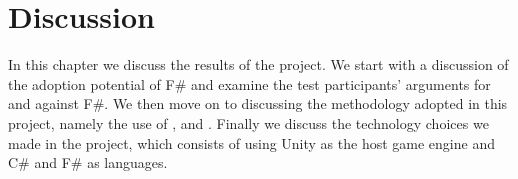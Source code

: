 \chapter{Discussion}
In this chapter we discuss the results of the project. We start with a discussion of the adoption potential of F\# and examine the test participants' arguments for and against F\#. We then move on to discussing the methodology adopted in this project, namely the use of \champagne, \attention and \cognitive. Finally we discuss the technology choices we made in the project, which consists of using Unity as the host game engine and C\# and F\# as languages.





